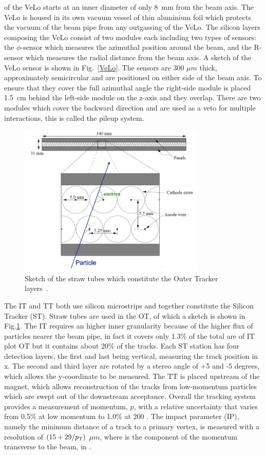 of the VeLo starts at an inner diameter of only 8~mm from the beam axis. The VeLo is housed in its own
vacuum vessel of thin aluminium foil which protects the vacuum of the beam pipe from any outgassing of
the VeLo. The silicon layers composing the VeLo consist of two modules each including two types of sensors:
the $\phi$-sensor which measures the azimuthal position around the beam, and the R-sensor which measures
the radial distance from the beam axis. A sketch of the VeLo sensor is shown in Fig.~\ref{VeLo}. The sensors
are 300 $\mu m$ thick, approximately semicircular and are positioned on either side of the beam axis.
To ensure that they cover the full azimuthal angle the right-side module is placed 1.5~cm behind the left-side
module on the z-axis and they overlap. There are two modules which cover the backward direction
and are used as a veto for multiple interactions, this is called the pileup system.
%
\begin{center}
\begin{figure}[h!]
\centering 
\includegraphics[width=0.8\textwidth]{Detector/figs/straw_tubes.png}
\caption{Sketch of the straw tubes which constitute the Outer Tracker layers~\cite{Alves:2008zz}.}
\label{fig:straw:tubes}
\end{figure}
\end{center}
%
The IT and TT both use silicon microstrips and together constitute the Silicon Tracker (ST). Straw tubes are used 
in the OT, of which a sketch is shown in Fig.\ref{fig:straw:tubes}. The IT requires an higher inner granularity
because of the higher flux of particles nearer the beam pipe, in fact it covers only 1.3\% of the total
are of IT plot OT but it contains about 20\% of the tracks. Each ST station has four detection layers,
the first and last being vertical, measuring the track position in x. The second 
and third layer are rotated by a stereo angle of +5 and -5 degrees, which allows the y-coordinate to be measured. 
The TT is placed upstream of the magnet, which allows reconstruction of the tracks from low-momentum particles
which are swept out of the downstream acceptance. Overall the tracking system provides a measurement of momentum, $p$, 
with a relative uncertainty that varies from 0.5\% at low momentum to 1.0\% at 200 \gevc. The impact parameter (IP),
namely the minimum distance of a track to a primary vertex, is measured with a resolution of $(15 + 29/\mbox{$p_{\rm T}$})$ $\mu m$,
where \pt is the component of the momentum transverse to the beam, in \gevc.


